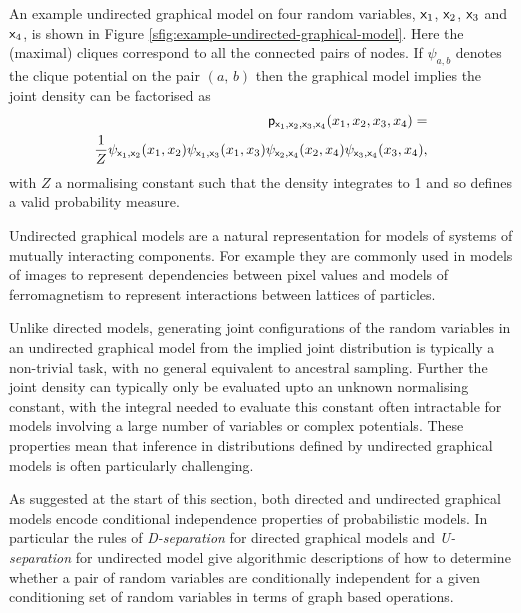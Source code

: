 An example undirected graphical model on four random variables, $\mathsf{x}_1$, $\mathsf{x}_2$, $\mathsf{x}_3$ and $\mathsf{x}_4$, is shown in Figure \ref{sfig:example-undirected-graphical-model}. Here the (maximal) cliques correspond to all the connected pairs of nodes. If $\psi_{a,b}$ denotes the clique potential on the pair $(a,\,b)$ then the graphical model implies the joint density can be factorised as
\begin{equation}\label{eq:example-undirected-graphical-model-factorisation}
\begin{split}
  \mathsf{p}_{\mathsf{x}_1,\mathsf{x}_2,\mathsf{x}_3,\mathsf{x}_4}(x_1,x_2,x_3,x_4) =\\
  \frac{1}{Z} 
  \psi_{\mathsf{x}_1,\mathsf{x}_2}(x_1,x_2)
  \psi_{\mathsf{x}_1,\mathsf{x}_3}(x_1,x_3)
  \psi_{\mathsf{x}_2,\mathsf{x}_4}(x_2,x_4)
  \psi_{\mathsf{x}_3,\mathsf{x}_4}(x_3,x_4),
\end{split}
\end{equation}
with $Z$ a normalising constant such that the density integrates to 1 and so defines a valid probability measure.

Undirected graphical models are a natural representation for models of systems of mutually interacting components. For example they are commonly used in models of images to represent dependencies between pixel values and models of ferromagnetism to represent interactions between lattices of particles. 

Unlike directed models, generating joint configurations of the random variables in an undirected graphical model from the implied joint distribution is typically a non-trivial task, with no general equivalent to ancestral sampling. Further the joint density can typically only be evaluated upto an unknown normalising constant, with the integral needed to evaluate this constant often intractable for models involving a large number of variables or complex potentials. These properties mean that inference in distributions defined by undirected graphical models is often particularly challenging.

As suggested at the start of this section, both directed and undirected graphical models encode conditional independence properties of probabilistic models. In particular the rules of \emph{D-separation} for directed graphical models and \emph{U-separation} for undirected model give algorithmic descriptions of how to determine whether a pair of random variables are conditionally independent for a given conditioning set of random variables in terms of graph based operations. 

